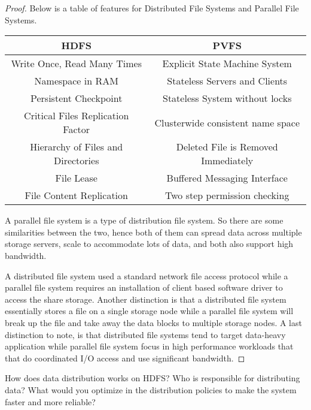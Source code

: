 \documentclass[12pt]{article}
\newenvironment{exercise}[2][Exercise]{\begin{trivlist}
\item[\hskip \labelsep {\bfseries #1}\hskip \labelsep {\bfseries #2.}]}{\end{trivlist}}
\begin{document}
\begin{proof}
Below is a table of features for Distributed File Systems and Parallel File Systems. 

\begin{center}
    \begin{tabular}{|c|c|}
        \hline
         \textbf{HDFS} & \textbf{PVFS}  \\
         \hline
         Write Once, Read Many Times & Explicit State Machine System \\
         \hline
         Namespace in RAM & Stateless Servers and Clients \\
         \hline 
         Persistent Checkpoint & Stateless System without locks\\ 
         \hline 
         Critical Files Replication Factor & Clusterwide consistent name space \\ 
         \hline 
         Hierarchy of Files and Directories & Deleted File is Removed Immediately \\ 
         \hline 
         File Lease & Buffered Messaging Interface\\ 
         \hline 
         File Content Replication & Two step permission checking \\ 
        \hline 
    \end{tabular}
\end{center}

A parallel file system is a type of distribution file system. So there are some similarities between the two, hence both of them can spread data across multiple storage servers, scale to accommodate lots of data, and both also support high bandwidth.

A distributed file system used a standard network file access protocol while a parallel file system requires an installation of client based software driver to access the share storage. Another distinction is that a distributed file system essentially stores a file on a single storage node while a parallel file system will break up the file and take away the data blocks to multiple storage nodes. A last distinction to note, is that distributed file systems tend to target data-heavy application while parallel file system focus in high performance workloads that that do coordinated I/O access and use significant bandwidth.  

\end{proof}

\begin{exercise}{10}
How does data distribution works on HDFS? Who is responsible for distributing data? What would you optimize in the distribution policies to make the system faster and more reliable? 
\end{exercise}
\end{document}
